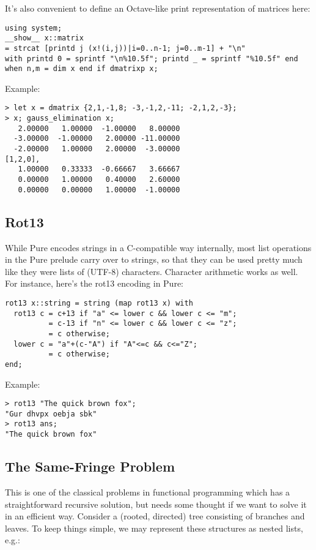 \documentclass[a4paper,12pt]{article}
\begin{document}
\pagebreak[2]
\noindent It's also convenient to define an Octave-like print representation
of matrices here:

\begin{lstlisting}
using system;
__show__ x::matrix
= strcat [printd j (x!(i,j))|i=0..n-1; j=0..m-1] + "\n"
with printd 0 = sprintf "\n%10.5f"; printd _ = sprintf "%10.5f" end
when n,m = dim x end if dmatrixp x;
\end{lstlisting}

\noindent Example:

\begin{lstlisting}
> let x = dmatrix {2,1,-1,8; -3,-1,2,-11; -2,1,2,-3};
> x; gauss_elimination x;
   2.00000   1.00000  -1.00000   8.00000
  -3.00000  -1.00000   2.00000 -11.00000
  -2.00000   1.00000   2.00000  -3.00000
[1,2,0],
   1.00000   0.33333  -0.66667   3.66667
   0.00000   1.00000   0.40000   2.60000
   0.00000   0.00000   1.00000  -1.00000
\end{lstlisting}

\subsection{Rot13}

While Pure encodes strings in a C-compatible way internally, most list
operations in the Pure prelude carry over to strings, so that they can be used
pretty much like they were lists of (UTF-8) characters. Character arithmetic
works as well. For instance, here's the rot13 encoding in Pure:

\begin{lstlisting}
rot13 x::string = string (map rot13 x) with
  rot13 c = c+13 if "a" <= lower c && lower c <= "m";
          = c-13 if "n" <= lower c && lower c <= "z";
          = c otherwise;
  lower c = "a"+(c-"A") if "A"<=c && c<="Z";
          = c otherwise;
end;
\end{lstlisting}

\noindent Example:

\begin{lstlisting}
> rot13 "The quick brown fox";
"Gur dhvpx oebja sbk"
> rot13 ans;
"The quick brown fox"
\end{lstlisting}

\subsection{The Same-Fringe Problem}

This is one of the classical problems in functional programming which has a
straightforward recursive solution, but needs some thought if we want to solve
it in an efficient way. Consider a (rooted, directed) tree consisting of
branches and leaves. To keep things simple, we may represent these structures
as nested lists, e.g.:
\end{document}
